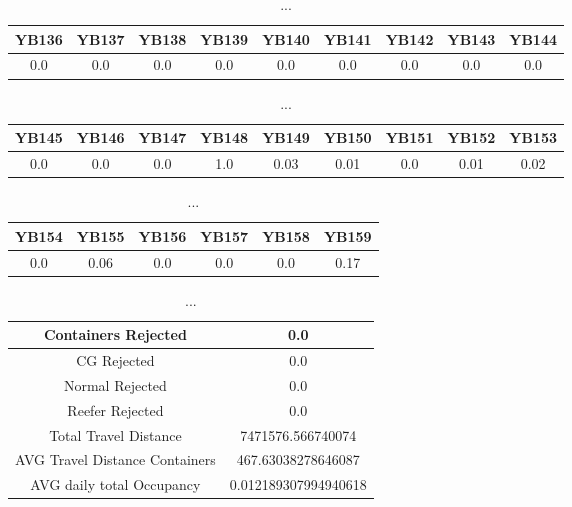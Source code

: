 \documentclass[]{article}
\begin{document}
\begin{table}[h]
	\centering
	\begin{tabular}{|c|c|c|c|c|c|c|c|c|}
		\hline
		YB136 & YB137 & YB138 & YB139 & YB140 & YB141 & YB142 & YB143 & YB144 \\
		\hline
		0.0   & 0.0   & 0.0   & 0.0   & 0.0   & 0.0   & 0.0   & 0.0   & 0.0   \\
		\hline
	\end{tabular}
	\caption{...}
\end{table}
\begin{table}[h]
	\centering
	\begin{tabular}{|c|c|c|c|c|c|c|c|c|}
		\hline
		YB145 & YB146 & YB147 & YB148 & YB149 & YB150 & YB151 & YB152 & YB153 \\
		\hline
		0.0   & 0.0   & 0.0   & 1.0   & 0.03  & 0.01  & 0.0   & 0.01  & 0.02  \\
		\hline
	\end{tabular}
	\caption{...}
\end{table}
\begin{table}[h]
	\centering
	\begin{tabular}{|c|c|c|c|c|c|}
		\hline
		YB154 & YB155 & YB156 & YB157 & YB158 & YB159 \\
		\hline
		0.0   & 0.06  & 0.0   & 0.0   & 0.0   & 0.17  \\
		\hline
	\end{tabular}
	\caption{...}
\end{table}
\begin{table}[h]
	\centering
	\begin{tabular}{|c|c|}
		\hline
		Containers Rejected            & 0.0                  \\ \hline
		CG Rejected                    & 0.0                  \\ \hline
		Normal Rejected                & 0.0                  \\ \hline
		Reefer Rejected                & 0.0                  \\ \hline
		Total Travel Distance          & 7471576.566740074    \\ \hline
		AVG Travel Distance Containers & 467.63038278646087   \\ \hline
		AVG daily total Occupancy      & 0.012189307994940618 \\ \hline
	\end{tabular}
	\caption{...}
\end{table}
\end{document}
